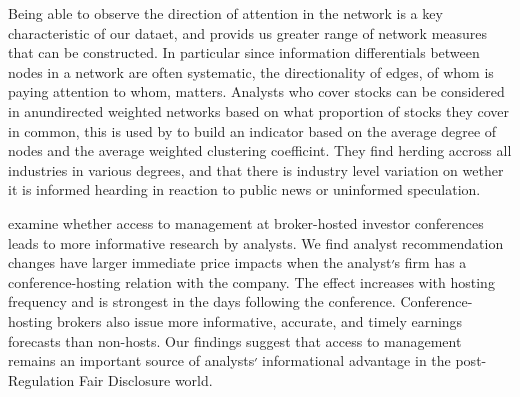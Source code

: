 Being able to observe the direction of attention in the network is a key characteristic of our dataet, and provids us greater range of network measures that can be constructed.
In particular since information differentials between nodes in a network are often systematic, the directionality of edges, of whom is paying attention to whom, matters.
Analysts who cover stocks can be considered in anundirected weighted networks based on what proportion of stocks they cover in common, this is used by  \cite{zhao2014analysis} to build an indicator based on the average degree of nodes and the average weighted clustering coefficint. 
They find herding accross all industries in various degrees, and that there is industry level variation on wether it is informed hearding in reaction to public news or uninformed speculation.

\cite{green2014access} examine whether access to management at broker-hosted investor conferences leads to more informative research by analysts. We find analyst recommendation changes have larger immediate price impacts when the analyst׳s firm has a conference-hosting relation with the company. The effect increases with hosting frequency and is strongest in the days following the conference. Conference-hosting brokers also issue more informative, accurate, and timely earnings forecasts than non-hosts. Our findings suggest that access to management remains an important source of analysts׳ informational advantage in the post-Regulation Fair Disclosure world.


